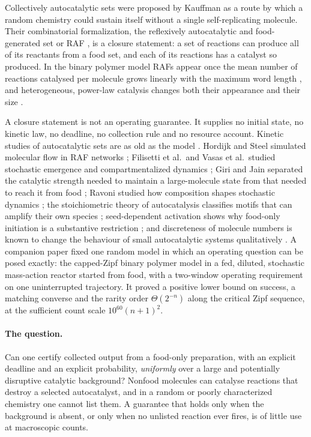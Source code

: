 \documentclass[11pt,letterpaper]{article}
\theoremstyle{plain}
\theoremstyle{definition}
\theoremstyle{remark}
\numberwithin{equation}{section}
\begin{document}
Collectively autocatalytic sets were proposed by Kauffman \cite{kauffman1986autocatalytic,farmer1986autocatalytic} as a route by which a random chemistry could sustain itself without a single self-replicating molecule. Their combinatorial formalization, the reflexively autocatalytic and food-generated set or RAF \cite{steel2000emergence,hordijk2004detecting,steel2019autocatalytic}, is a closure statement: a set of reactions can produce all of its reactants from a food set, and each of its reactions has a catalyst so produced. In the binary polymer model RAFs appear once the mean number of reactions catalysed per molecule grows linearly with the maximum word length \cite{mossel2005random,hordijk2011required}, and heterogeneous, power-law catalysis changes both their appearance and their size \cite{hordijk2016variable,hordijk2017chasing}.

A closure statement is not an operating guarantee. It supplies no initial state, no kinetic law, no deadline, no collection rule and no resource account. Kinetic studies of autocatalytic sets are as old as the model \cite{farmer1986autocatalytic}. Hordijk and Steel simulated molecular flow in RAF networks \cite{hordijk2012extended}; Filisetti et al.\ and Vasas et al.\ studied stochastic emergence and compartmentalized dynamics \cite{filisetti2011stochastic,vasas2012evolution}; Giri and Jain separated the catalytic strength needed to maintain a large-molecule state from that needed to reach it from food \cite{giri2012origin}; Ravoni studied how composition shapes stochastic dynamics \cite{ravoni2020composition}; the stoichiometric theory of autocatalysis classifies motifs that can amplify their own species \cite{blokhuis2020universal,unterberger2022stoechiometric}; seed-dependent activation shows why food-only initiation is a substantive restriction \cite{peng2022hierarchical}; and discreteness of molecule numbers is known to change the behaviour of small autocatalytic systems qualitatively \cite{togashi2001transitions}. A companion paper \cite{twowindow2026} fixed one random model in which an operating question can be posed exactly: the capped-Zipf binary polymer model in a fed, diluted, stochastic mass-action reactor started from food, with a two-window operating requirement on one uninterrupted trajectory. It proved a positive lower bound on success, a matching converse and the rarity order $\Theta(2^{-n})$ along the critical Zipf sequence, at the sufficient count scale $10^{60}(n+1)^2$.

\paragraph{The question.}
Can one certify collected output from a food-only preparation, with an explicit deadline and an explicit probability, \emph{uniformly} over a large and potentially disruptive catalytic background? Nonfood molecules can catalyse reactions that destroy a selected autocatalyst, and in a random or poorly characterized chemistry one cannot list them. A guarantee that holds only when the background is absent, or only when no unlisted reaction ever fires, is of little use at macroscopic counts.
\end{document}
